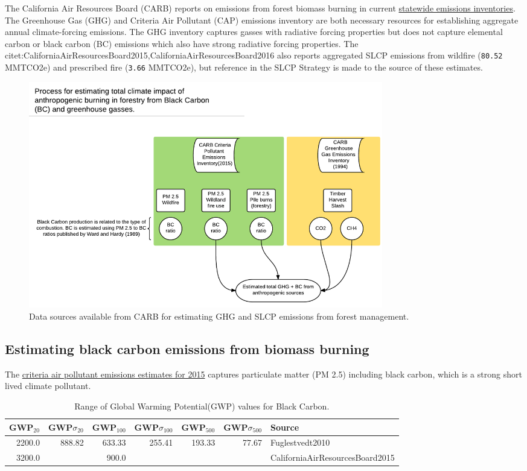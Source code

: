\documentclass[a4paper]{article}
\begin{document}
The California Air Resources Board (CARB) reports on
emissions from forest biomass burning in current
\href{http://www.arb.ca.gov/ei/ei.htm}{statewide emissions inventories}. The Greenhouse Gas (GHG) and Criteria Air
Pollutant (CAP) emissions inventory are both necessary resources for establishing
aggregate annual climate-forcing emissions. The GHG inventory captures
gasses with radiative forcing properties but does not capture elemental
carbon or black carbon (BC) emissions which also have strong radiative
forcing properties. The citet:CaliforniaAirResourcesBoard2015,CaliforniaAirResourcesBoard2016
also reports aggregated SLCP emissions from wildfire
(\texttt{80.52} MMTCO2e) and prescribed fire
(\texttt{3.66} MMTCO2e), but reference in the
SLCP Strategy is made to the source of these estimates.

\begin{figure}[htb]
\centering
\includegraphics[width=0.75\textwidth]{./graphics/burning.pdf}
\caption{Data sources available from CARB for estimating GHG and SLCP emissions from forest management.}
\end{figure}


\subsection{Estimating black carbon emissions from biomass burning}
\label{sec-2-1}
The
\href{http://www.arb.ca.gov/ei/emissiondata.htm}{criteria air pollutant
emissions estimates for 2015} captures particulate matter (PM 2.5) including black carbon, which
is a strong short lived climate pollutant.






\begin{table}[htb]
\caption{Range of Global Warming Potential(GWP) values for Black Carbon.}
\centering
\begin{tabular}{rrrrrrl}
GWP$_{\text{20}}$ & GWP$\sigma$$_{\text{20}}$ & GWP$_{\text{100}}$ & GWP$\sigma$$_{\text{100}}$ & GWP$_{\text{500}}$ & GWP$\sigma$$_{\text{500}}$ & Source\\
\hline
2200.0 & 888.82 & 633.33 & 255.41 & 193.33 & 77.67 & Fuglestvedt2010\\
3200.0 &  & 900.0 &  &  &  & CaliforniaAirResourcesBoard2015\\
\end{tabular}
\end{table}
\end{document}
